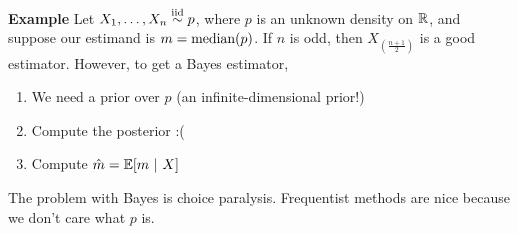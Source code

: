 \begin{example}{\textbf{Example}}
    Let $X_1, \ldots, X_n \iidsim p$, where $p$ is an unknown density on $\R$, and suppose our estimand is $m = \tt{median}(p)$. If $n$ is odd, then $X_{\left(\frac{n + 1}{2}\right)}$ is a good estimator. However, to get a Bayes estimator,
    \begin{enumerate}
        \item We need a prior over $p$ (an infinite-dimensional prior!)
        \item Compute the posterior :(
        \item Compute $\hat{m} = \bb{E}[m \given X]$
    \end{enumerate}
\end{example}
The problem with Bayes is choice paralysis. Frequentist methods are nice because we don't care what $p$ is.
